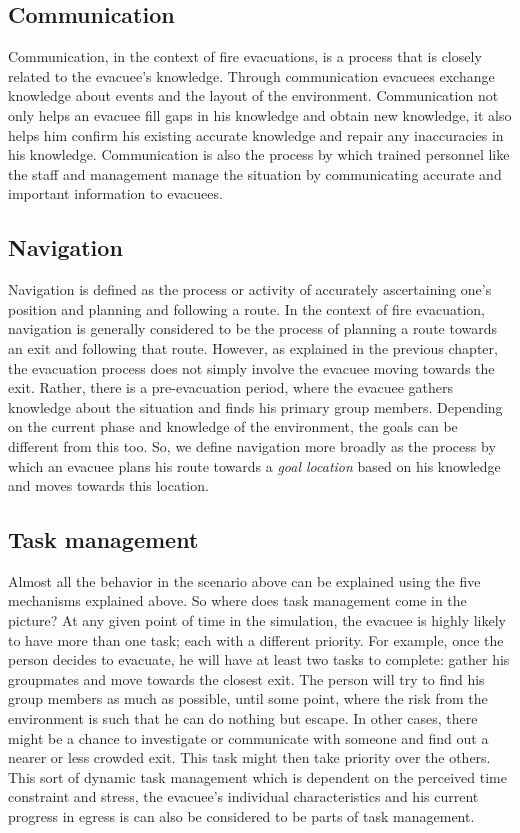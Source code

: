 \subsection{Communication}
\label{IBEVAC:Communication}

	Communication, in the context of fire evacuations, is a process that is closely related to the evacuee's knowledge. Through communication evacuees exchange knowledge about events and the layout of the environment. Communication not only helps an evacuee fill gaps in his knowledge and obtain new knowledge, it also helps him confirm his existing accurate knowledge and repair any inaccuracies in his knowledge. Communication is also the process by which trained personnel like the staff and management manage the situation by communicating accurate and important information to evacuees.

\subsection{Navigation}
\label{IBEVAC:Navigation}

	Navigation is defined as the process or activity of accurately ascertaining one's position and planning and following a route. In the context of fire evacuation, navigation is generally considered to be the process of planning a route towards an exit and following that route. However, as explained in the previous chapter, the evacuation process does not simply involve the evacuee moving towards the exit. Rather, there is a pre-evacuation period, where the evacuee gathers knowledge about the situation and finds his primary group members. Depending on the current phase and knowledge of the environment, the goals can be different from this too. So, we define navigation more broadly as the process by which an evacuee plans his route towards a \emph{goal location} based on his knowledge and moves towards this location. 


\subsection{Task management}
\label{IBEVAC:TaskManagement}
	Almost all the behavior in the scenario above can be explained using the five mechanisms explained above. So where does task management come in the picture? At any given point of time in the simulation, the evacuee is highly likely to have more than one task; each with a different priority. For example, once the person decides to evacuate, he will have at least two tasks to complete: gather his groupmates and move towards the closest exit. The person will try to find his group members as much as possible, until some point, where the risk from the environment is such that he can do nothing but escape. In other cases, there might be a chance to investigate or communicate with someone and find out a nearer or less crowded exit. This task might then take priority over the others. This sort of dynamic task management which is dependent on the perceived time constraint and stress, the evacuee's individual characteristics and his current progress in egress is can also be considered to be parts of task management.

